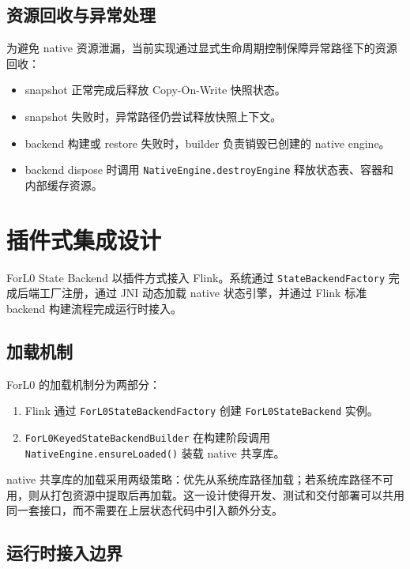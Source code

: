 \documentclass[a4paper,11pt]{article}
\newcommand{\project}{ForL0 State Backend}
\begin{document}
\subsection{资源回收与异常处理}

为避免 native 资源泄漏，当前实现通过显式生命周期控制保障异常路径下的资源回收：

\begin{itemize}
  \item snapshot 正常完成后释放 Copy-On-Write 快照状态。
  \item snapshot 失败时，异常路径仍尝试释放快照上下文。
  \item backend 构建或 restore 失败时，builder 负责销毁已创建的 native engine。
  \item backend dispose 时调用 \texttt{NativeEngine.destroyEngine} 释放状态表、容器和内部缓存资源。
\end{itemize}

\section{插件式集成设计}

\project{} 以插件方式接入 Flink。系统通过 \texttt{StateBackendFactory} 完成后端工厂注册，通过 JNI 动态加载 native 状态引擎，并通过 Flink 标准 backend 构建流程完成运行时接入。

\subsection{加载机制}

ForL0 的加载机制分为两部分：

\begin{enumerate}
  \item Flink 通过 \texttt{ForL0StateBackendFactory} 创建 \texttt{ForL0StateBackend} 实例。
  \item \texttt{ForL0KeyedStateBackendBuilder} 在构建阶段调用 \texttt{NativeEngine.ensureLoaded()} 装载 native 共享库。
\end{enumerate}

native 共享库的加载采用两级策略：优先从系统库路径加载；若系统库路径不可用，则从打包资源中提取后再加载。这一设计使得开发、测试和交付部署可以共用同一套接口，而不需要在上层状态代码中引入额外分支。

\subsection{运行时接入边界}
\end{document}
